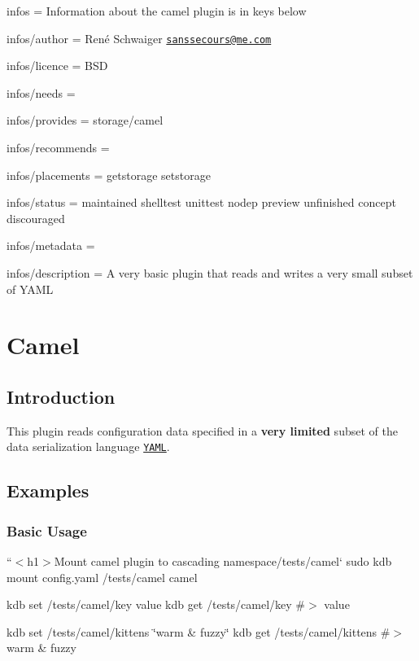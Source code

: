 
\begin{DoxyItemize}
\item infos = Information about the camel plugin is in keys below
\item infos/author = René Schwaiger \href{mailto:sanssecours@me.com}{\tt sanssecours@me.\+com}
\item infos/licence = B\+SD
\item infos/needs =
\item infos/provides = storage/camel
\item infos/recommends =
\item infos/placements = getstorage setstorage
\item infos/status = maintained shelltest unittest nodep preview unfinished concept discouraged
\item infos/metadata =
\item infos/description = A very basic plugin that reads and writes a very small subset of Y\+A\+ML
\end{DoxyItemize}\hypertarget{md_src_plugins_camel_README_src_plugins_camel_README_md}{}\section{Camel}\label{md_src_plugins_camel_README_src_plugins_camel_README_md}
\subsection*{Introduction}

This plugin reads configuration data specified in a {\bfseries very limited} subset of the data serialization language \href{http://www.yaml.org}{\tt Y\+A\+ML}.

\subsection*{Examples}

\subsubsection*{Basic Usage}

``{\ttfamily  $<$h1$>$Mount camel plugin to cascading namespace}/tests/camel` sudo kdb mount config.\+yaml /tests/camel camel

kdb set /tests/camel/key value kdb get /tests/camel/key \#$>$ value

kdb set /tests/camel/kittens \char`\"{}warm \& fuzzy\char`\"{} kdb get /tests/camel/kittens \#$>$ warm \& fuzzy

